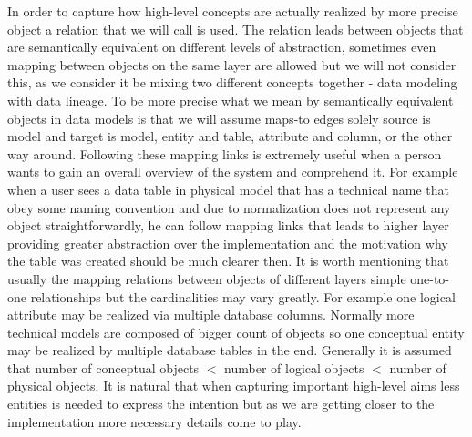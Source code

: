 In order to capture how high-level concepts are actually realized by more precise object a relation that we will call  is used. The relation leads between objects that are semantically equivalent on different levels of abstraction, sometimes even mapping between objects on the same layer are allowed but we will not consider this, as we consider it be mixing two different concepts together - data modeling with data lineage. To be more precise what we mean by semantically equivalent objects in data models is that we will assume maps-to edges solely source is model and target is model, entity and table, attribute and column, or the other way around.
Following these mapping links is extremely useful when a person wants to gain an overall overview of the system and comprehend it. For example when a user sees a data table in physical model that has a technical name that obey some naming convention and due to normalization does not represent any object straightforwardly, he can follow mapping links that leads to higher layer providing greater  abstraction over the implementation and the motivation why the table was created should be much clearer then.
It is worth mentioning that usually the mapping relations between objects of different layers simple one-to-one relationships but the cardinalities may vary greatly. For example one logical attribute may be realized via multiple database columns.
Normally more technical models are composed of bigger count of objects so one conceptual entity may be realized by multiple database tables in the end. Generally it is assumed that number of conceptual objects $<$ number of logical objects $<$ number of physical objects. It is natural that when capturing important high-level aims less entities is needed to express the intention but as we are getting closer to the implementation more necessary details come to play.

